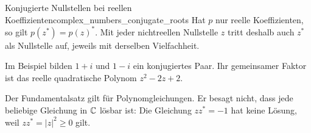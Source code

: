 \par\noindent\begin{minipage}{\linewidth}
\begin{KeyPointBox}{Konjugierte Nullstellen bei reellen Koeffizienten}{complex_numbers_conjugate_roots}
  Hat $p$ nur reelle Koeffizienten, so gilt $p(z^*)=p(z)^*$.
  Mit jeder nichtreellen Nullstelle $z$ tritt deshalb auch $z^*$ als
  Nullstelle auf, jeweils mit derselben Vielfachheit.
\end{KeyPointBox}
Im Beispiel bilden $1+i$ und $1-i$ ein konjugiertes Paar. Ihr gemeinsamer
Faktor ist das reelle quadratische Polynom $z^2-2z+2$.

\begin{RemarkBox}
  Der Fundamentalsatz gilt für Polynomgleichungen. Er besagt nicht,
  dass jede beliebige Gleichung in $\mathbb{C}$ lösbar ist: Die Gleichung
  $zz^*=-1$ hat keine Lösung, weil $zz^*=|z|^2\ge0$ gilt.
\end{RemarkBox}
\end{minipage}\par
